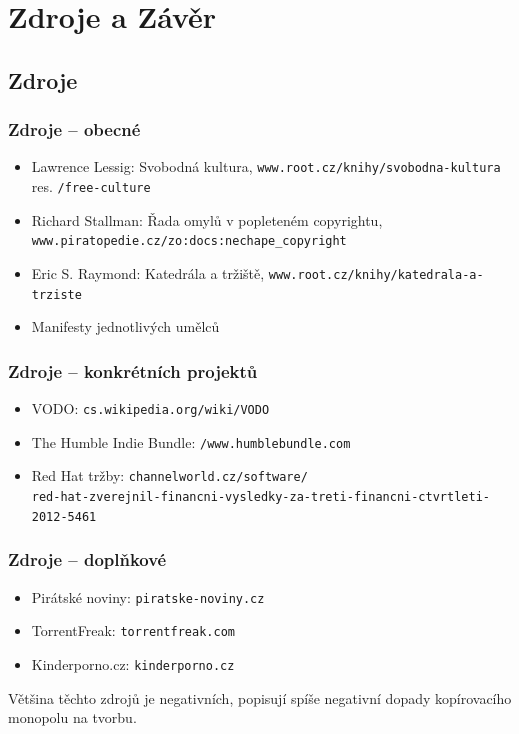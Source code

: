 \documentclass[xetex]{beamer}
\begin{document}
\section{Zdroje a Závěr}
\subsection{Zdroje}
\begin{frame}
  \frametitle{Zdroje -- obecné}
  \begin{itemize}
	\item Lawrence Lessig: Svobodná kultura, \texttt{www.root.cz/knihy/svobodna-kultura} res. \texttt{/free-culture}
	\item Richard Stallman: Řada omylů v popleteném copyrightu, 
		\texttt{www.piratopedie.cz/zo:docs:nechape\_copyright}
	\item Eric S. Raymond: Katedrála a tržiště, \texttt{www.root.cz/knihy/katedrala-a-trziste}	
	\item Manifesty jednotlivých umělců
  \end{itemize}
\end{frame}


\begin{frame}
  \frametitle{Zdroje -- konkrétních projektů}
  \begin{itemize}
	\item VODO: \texttt{cs.wikipedia.org/wiki/VODO}
	\item The Humble Indie Bundle: \texttt{/www.humblebundle.com}
	\item Red Hat tržby: \tiny{\texttt{channelworld.cz/software/\\
red-hat-zverejnil-financni-vysledky-za-treti-financni-ctvrtleti-2012-5461}}
  \end{itemize}
\end{frame}

\begin{frame}
  \frametitle{Zdroje -- doplňkové}
  \begin{itemize}
	\item Pirátské noviny: \texttt{piratske-noviny.cz}
	\item TorrentFreak: \texttt{torrentfreak.com}
	\item Kinderporno.cz: \texttt{kinderporno.cz}
  \end{itemize}
Většina těchto zdrojů je negativních, popisují spíše negativní dopady kopírovacího monopolu na tvorbu. 
\end{frame}
\end{document}
